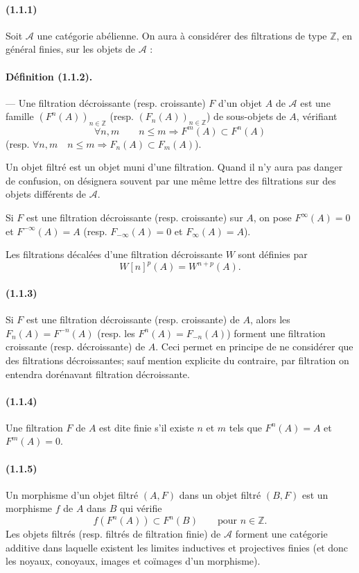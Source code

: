 \documentclass[10pt]{article}
\newcommand{\Z}{\mathbb Z}
\newcommand{\fg}{\guillemotright}
\newcommand{\og}{\guillemotleft}
\newcommand{\calA}{\mathcal A}
\begin{document}
\paragraph{(1.1.1)} Soit $\calA$ une catégorie abélienne. On aura à considérer des filtrations de type $\Z$, en général finies, sur les objets de $\calA$ :

\paragraph{Définition (1.1.2).} --- Une filtration décroissante (resp. croissante) $F$ d'un objet $A$ de $\calA$ est une famille $(F^n(A))_{n\in\Z}$ (resp. $(F_n(A))_{n\in\Z}$) de sous-objets de $A$, vérifiant
\[
\forall n,m\qquad n\le m\Rightarrow F^m(A)\subset F^n(A)
\]
(resp. $\forall n,m\quad n\le m\Rightarrow F_n(A)\subset F_m(A)$).

Un objet filtré est un objet muni d'une filtration. Quand il n'y aura pas danger de confusion, on désignera souvent par une même lettre des filtrations sur des objets différents de $\calA$.

Si $F$ est une filtration décroissante (resp. croissante) sur $A$, on pose $F^\infty(A)=0$ et $F^{-\infty}(A)=A$ (resp. $F_{-\infty}(A)=0$ et $F_{\infty}(A)=A$).

Les filtrations décalées d'une filtration décroissante $W$ sont définies par
\[
W[n]^p(A)=W^{n+p}(A).
\]

\paragraph{(1.1.3)} Si $F$ est une filtration décroissante (resp. croissante) de $A$, alors les $F_n(A)=F^{-n}(A)$ (resp. les $F^n(A)=F_{-n}(A)$) forment une filtration croissante (resp. décroissante) de $A$. Ceci permet en principe de ne considérer que des filtrations décroissantes; sauf mention explicite du contraire, par \og filtration\fg{} on entendra dorénavant \og filtration décroissante\fg{}.

\paragraph{(1.1.4)} Une filtration $F$ de $A$ est dite finie s'il existe $n$ et $m$ tels que $F^n(A)=A$ et $F^m(A)=0$.

\paragraph{(1.1.5)} Un morphisme d'un objet filtré $(A,F)$ dans un objet filtré $(B,F)$ est un morphisme $f$ de $A$ dans $B$ qui vérifie
\[
f(F^n(A))\subset F^n(B)\qquad\text{pour }n\in\Z.
\]
Les objets filtrés (resp. filtrés de filtration finie) de $\calA$ forment une catégorie additive dans laquelle existent les limites inductives et projectives finies (et donc les noyaux, conoyaux, images et coïmages d'un morphisme).
\end{document}
